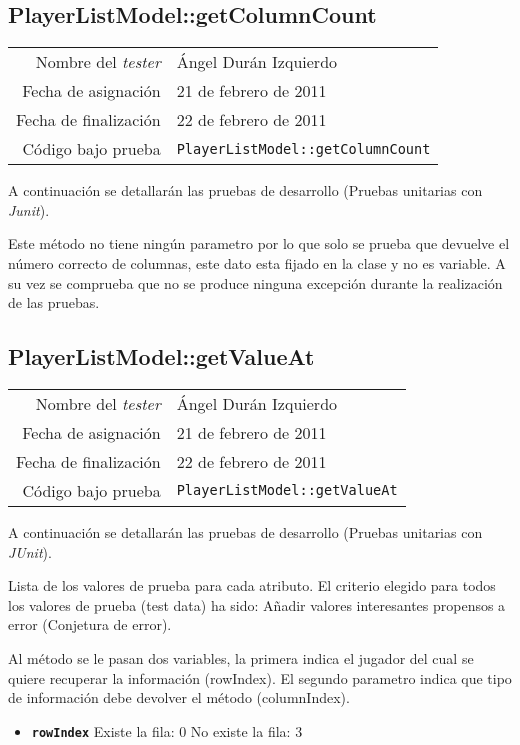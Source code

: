 \subsection{PlayerListModel::getColumnCount}

{\small
\begin{tabular}{r|l}
Nombre del \textit{tester} & \'Angel Dur\'an Izquierdo\\
Fecha de asignación & 21 de febrero de 2011 \\
Fecha de finalización & 22 de febrero de 2011 \\
Código bajo prueba & \texttt{PlayerListModel::getColumnCount}
\end{tabular}
}

A continuación se detallarán las pruebas de desarrollo (Pruebas unitarias con \textit{Junit}).

Este m\'etodo no tiene ning\'un parametro por lo que solo se prueba que devuelve el n\'umero correcto de columnas, este dato esta fijado en la clase y no es variable. A su vez se comprueba que no se produce ninguna excepci\'on durante la realizaci\'on de las pruebas.

\subsection{PlayerListModel::getValueAt}

{\small
\begin{tabular}{r|l}
Nombre del \textit{tester} & \'Angel Dur\'an Izquierdo\\
Fecha de asignación & 21 de febrero de 2011 \\
Fecha de finalización & 22 de febrero de 2011 \\
Código bajo prueba & \texttt{PlayerListModel::getValueAt}
\end{tabular}
}

A continuación se detallarán las pruebas de desarrollo (Pruebas unitarias con \textit{JUnit}).

Lista de los valores de prueba para cada atributo.
El criterio elegido para todos los valores de prueba (test data) ha sido: Añadir valores interesantes propensos a error (Conjetura de error).

Al m\'etodo se le pasan dos variables, la primera indica el jugador del cual se quiere recuperar la informaci\'on (rowIndex). El segundo parametro indica que tipo de informaci\'on debe devolver el m\'etodo (columnIndex).

\begin{itemize}
\item \textbf{\texttt{rowIndex}}
\subitem Existe la fila: 0
\subitem No existe la fila: 3
\end{itemize}

